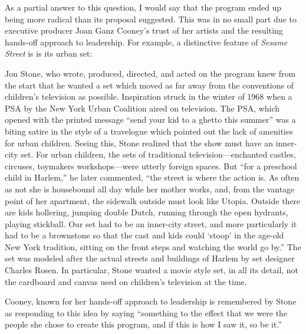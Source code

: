 \documentclass[12pt,letterpaper]{article}
\newcommand{\ses}{\textit{Sesame Street }}
\begin{document}
	As a partial answer to this question, I would say that the program ended
	up being more radical than its proposal suggested. This was in no small 
	part due to executive producer Joan Ganz Cooney’s trust of her artists 
	and 
	the resulting hands-off approach to leadership.\autocite[155]{Davis} For
	example, a distinctive feature of \ses is is its urban set:

	Jon Stone, who wrote, produced, directed, and acted on the program knew
	from the start that he wanted a set which moved as far away from the 	
	conventions of children's television as possible.  
	Inspiration struck in the winter of 1968 when a PSA by the New York 
	Urban Coalition aired on television. The PSA, which opened with the
	printed message ``send your kid to a ghetto this summer''  was a biting
	satire in the style of a travelogue which pointed out the lack of 
	amenities for urban children. Seeing this, Stone realized that the show
	must have an inner-city set. For urban children, the sets of traditional
	television---enchanted castles, circuses, toymakers workshops---were
	utterly foreign spaces. But ``for a preschool child
	in Harlem,'' he later commented, ``the street is where the action is. As
	often as not she is housebound all day while her mother works, and, from	the vantage point of her apartment, the sidewalk outside must look like
	Utopia. Outside there are kids hollering, jumping double Dutch, running
	through the open hydrants, playing stickball. Our set had to be an 
	inner-city street, and more particularly it had to be a brownstone so 
	that the cast and kids could `stoop' in the age-old New York tradition,
	sitting on the front steps and watching the world go by.'' The set was 
	modeled after the actual streets and buildings of Harlem by set designer
	Charles Rosen. In particular, Stone wanted a movie style set, in all its
	detail, not the cardboard and canvas used on children's television at 
	the time.\autocite[154]{Davis}

	Cooney, known for her hands-off approach to leadership is remembered by
	Stone as responding to this idea by saying ``something to the effect 
	that we were the people she chose to create this program, and if this is
	how I saw it, so be it.'' \autocite[155]{Davis} 
\end{document}
